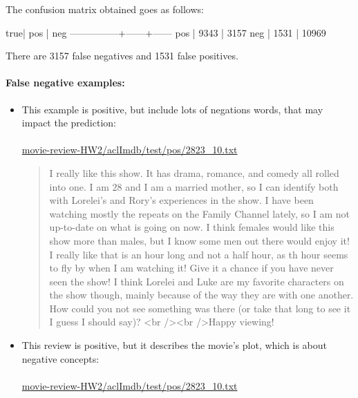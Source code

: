 \documentclass{article}
\begin{document}
The confusion matrix obtained goes as follows:

\begin{python}
true\predicted |  pos |   neg
---------------+------+------
           pos | 9343 |  3157
           neg | 1531 | 10969
\end{python}

There are 3157 false negatives and 1531 false positives.

\paragraph{False negative examples:}

\begin{itemize}
    \item This example is positive, but include lots of negations words, that may impact the prediction:

    \paragraph{} \url{movie-review-HW2/aclImdb/test/pos/2823_10.txt}
    
    \begin{quotation}
        I really like this show. It has drama, romance, and comedy all rolled into one. I am 28 and I am a married mother, so I can identify both with Lorelei's and Rory's experiences in the show. I have been watching mostly the repeats on the Family Channel lately, so I am not up-to-date on what is going on now. I think females would like this show more than males, but I know some men out there would enjoy it! I really like that is an hour long and not a half hour, as th hour seems to fly by when I am watching it! Give it a chance if you have never seen the show! I think Lorelei and Luke are my favorite characters on the show though, mainly because of the way they are with one another. How could you not see something was there (or take that long to see it I guess I should say)? <br /><br />Happy viewing!
    \end{quotation}
    

    \item This review is positive, but it describes the movie's plot, which is about negative concepts:
    
    \paragraph{} \url{movie-review-HW2/aclImdb/test/pos/2823_10.txt}
    

\end{itemize}
\end{document}
